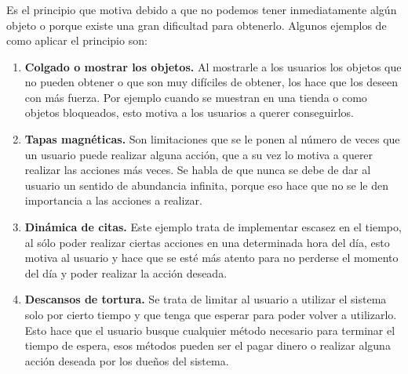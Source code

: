 \begin{enumerate}
    \end{enumerate}
    
\subsubsection{\principioVI} \label{subsec:principioVI}

 Es el principio que motiva debido a que no podemos tener inmediatamente algún objeto o porque
 existe una gran dificultad para obtenerlo\cite[p. 233]{Octalysis}. Algunos ejemplos de como
 aplicar el principio son:
        
    \begin{enumerate}
    \item \textbf{Colgado o mostrar los objetos.}\cite[p. 252]{Octalysis}
        Al mostrarle a los usuarios los objetos que no pueden obtener o que son muy difíciles
        de obtener, los hace que los deseen con más fuerza. Por ejemplo cuando se muestran en
        una tienda o como objetos bloqueados, esto motiva a los usuarios a querer conseguirlos.
            
    \item \textbf{Tapas magnéticas.}\cite[p. 256]{Octalysis}
        Son limitaciones que se le ponen al número de veces que un usuario puede realizar alguna
        acción, que a su vez lo motiva a querer realizar las acciones más veces. Se habla de que
        nunca se debe de dar al usuario un sentido de abundancia infinita, porque eso hace que
        no se le den importancia a las acciones a realizar.
            
    \item \textbf{Dinámica de citas.}\cite[p. 258]{Octalysis}
        Este ejemplo trata de implementar escasez en el tiempo, al sólo poder realizar ciertas
        acciones en una determinada hora del día, esto motiva al usuario y hace que se esté más
        atento para no perderse el momento del día y poder realizar la acción deseada.
            
    \item \textbf{Descansos de tortura.}\cite[p. 261]{Octalysis}
        Se trata de limitar al usuario a utilizar el sistema solo por cierto tiempo y que tenga
        que esperar para poder volver a utilizarlo. Esto hace que el usuario busque cualquier
        método necesario para terminar el tiempo de espera, esos métodos pueden ser el pagar
        dinero o realizar alguna acción deseada por los dueños del sistema.
    \end{enumerate}

